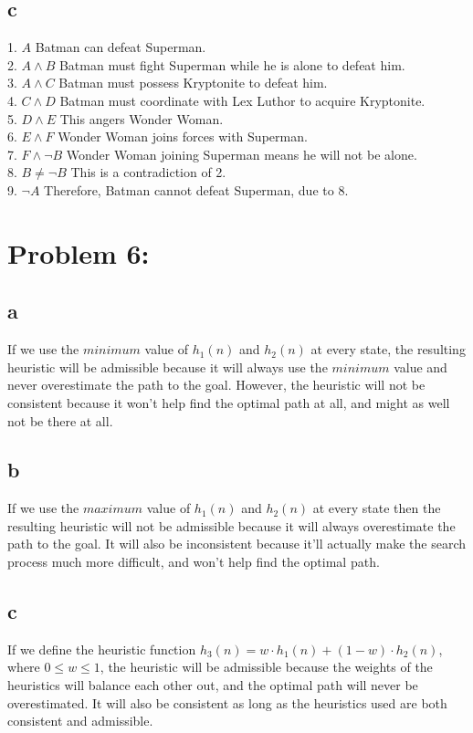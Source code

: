 \documentclass[11pt, oneside]{article}   	%
\begin{document}
\begin{flushleft}
\subsection*{c}
1. $A$ Batman can defeat Superman. \\
2. $A \wedge B$ Batman must fight Superman while he is alone to defeat him. \\
3. $A \wedge C$ Batman must possess Kryptonite to defeat him. \\
4. $C \wedge D$ Batman must coordinate with Lex Luthor to acquire Kryptonite. \\
5. $D \wedge E$ This angers Wonder Woman. \\
6. $E \wedge F$ Wonder Woman joins forces with Superman. \\
7. $F \wedge \neg B$ Wonder Woman joining Superman means he will not be alone. \\
8. $B \neq \neg B$ This is a contradiction of 2. \\
9. $\neg A$ Therefore, Batman cannot defeat Superman, due to 8.\\\medskip

\section*{Problem 6:}
\subsection*{a}
If we use the $minimum$ value of $h_{1}(n)$ and $h_{2}(n)$ at every state, the resulting heuristic will be admissible because it will always use the $minimum$ value and never overestimate the path to the goal. However, the heuristic will not be consistent because it won't help find the optimal path at all, and might as well not be there at all. \\\medskip

\subsection*{b}
If we use the $maximum$ value of $h_{1}(n)$ and $h_{2}(n)$ at every state then the resulting heuristic will not be admissible because it will always overestimate the path to the goal. It will also be inconsistent because it'll actually make the search process much more difficult, and won't help find the optimal path. \\\medskip

\subsection*{c}
If we define the heuristic function $h_{3}(n) = w \cdot h_{1}(n)+(1-w) \cdot h_{2}(n)$, where $0 \leq w \leq 1$, the heuristic will be admissible because the weights of the heuristics will balance each other out, and the optimal path will never be overestimated. It will also be consistent as long as the heuristics used are both consistent and admissible.


\end{flushleft}
\end{document}
